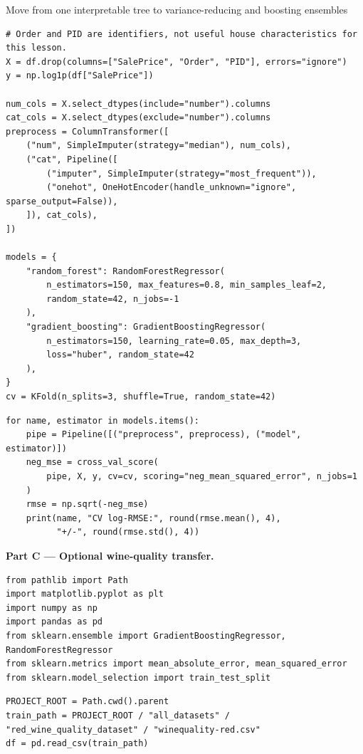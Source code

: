 \begin{labproject}{Move from one interpretable tree to variance-reducing and boosting ensembles}
\begin{lstlisting}[style=mlpython]
# Order and PID are identifiers, not useful house characteristics for this lesson.
X = df.drop(columns=["SalePrice", "Order", "PID"], errors="ignore")
y = np.log1p(df["SalePrice"])

num_cols = X.select_dtypes(include="number").columns
cat_cols = X.select_dtypes(exclude="number").columns
preprocess = ColumnTransformer([
    ("num", SimpleImputer(strategy="median"), num_cols),
    ("cat", Pipeline([
        ("imputer", SimpleImputer(strategy="most_frequent")),
        ("onehot", OneHotEncoder(handle_unknown="ignore", sparse_output=False)),
    ]), cat_cols),
])

models = {
    "random_forest": RandomForestRegressor(
        n_estimators=150, max_features=0.8, min_samples_leaf=2,
        random_state=42, n_jobs=-1
    ),
    "gradient_boosting": GradientBoostingRegressor(
        n_estimators=150, learning_rate=0.05, max_depth=3,
        loss="huber", random_state=42
    ),
}
cv = KFold(n_splits=3, shuffle=True, random_state=42)
\end{lstlisting}

\begin{lstlisting}[style=mlpython]
for name, estimator in models.items():
    pipe = Pipeline([("preprocess", preprocess), ("model", estimator)])
    neg_mse = cross_val_score(
        pipe, X, y, cv=cv, scoring="neg_mean_squared_error", n_jobs=1
    )
    rmse = np.sqrt(-neg_mse)
    print(name, "CV log-RMSE:", round(rmse.mean(), 4),
          "+/-", round(rmse.std(), 4))
\end{lstlisting}

\medskip\noindent\textbf{Part C --- Optional wine-quality transfer.}\par
\begin{lstlisting}[style=mlpython]
from pathlib import Path
import matplotlib.pyplot as plt
import numpy as np
import pandas as pd
from sklearn.ensemble import GradientBoostingRegressor, RandomForestRegressor
from sklearn.metrics import mean_absolute_error, mean_squared_error
from sklearn.model_selection import train_test_split
\end{lstlisting}

\begin{lstlisting}[style=mlpython]
PROJECT_ROOT = Path.cwd().parent
train_path = PROJECT_ROOT / "all_datasets" / "red_wine_quality_dataset" / "winequality-red.csv"
df = pd.read_csv(train_path)
\end{lstlisting}


\end{labproject}
